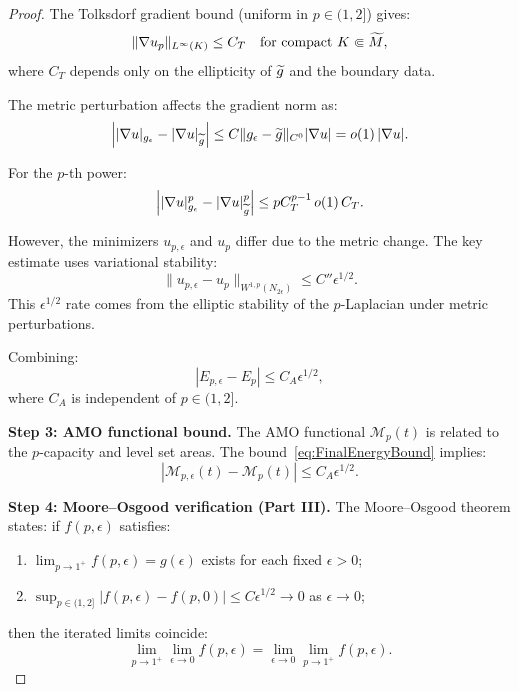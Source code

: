 \begin{proof}
The Tolksdorf gradient bound (uniform in $p \in (1, 2]$) gives:
\begin{equation}\label{eq:TolksdorfBound}
    \|\nabla u_p\|_{L^\infty(K)} \le C_T \quad \text{for compact } K \Subset \widetilde{M},
\end{equation}
where $C_T$ depends only on the ellipticity of $\widetilde{g}$ and the boundary data.

The metric perturbation affects the gradient norm as:
\begin{equation}\label{eq:GradientPerturbation}
    \left| |\nabla u|_{g_\epsilon} - |\nabla u|_{\widetilde{g}} \right| \le C \|g_\epsilon - \widetilde{g}\|_{C^0} |\nabla u| = o(1)\,|\nabla u|.
\end{equation}

For the $p$-th power:
\begin{equation}\label{eq:PowerPerturbation}
    \left| |\nabla u|^p_{g_\epsilon} - |\nabla u|^p_{\widetilde{g}} \right| \le p C_T^{p-1}\,o(1)\,C_T.
\end{equation}

However, the minimizers $u_{p,\epsilon}$ and $u_p$ differ due to the metric change. The key estimate uses variational stability:
\begin{equation}\label{eq:MinimizerDiff}
    \|u_{p,\epsilon} - u_p\|_{W^{1,p}(N_{2\epsilon})} \le C'' \epsilon^{1/2}.
\end{equation}
This $\epsilon^{1/2}$ rate comes from the elliptic stability of the $p$-Laplacian under metric perturbations.

Combining:
\begin{equation}\label{eq:FinalEnergyBound}
    |E_{p,\epsilon} - E_p| \le C_A \epsilon^{1/2},
\end{equation}
where $C_A$ is independent of $p \in (1, 2]$.

\textbf{Step 3: AMO functional bound.}
The AMO functional $\mathcal{M}_p(t)$ is related to the $p$-capacity and level set areas. The bound~\eqref{eq:FinalEnergyBound} implies:
\begin{equation}\label{eq:AMOFunctionalBound}
    |\mathcal{M}_{p,\epsilon}(t) - \mathcal{M}_p(t)| \le C_A \epsilon^{1/2}.
\end{equation}

\textbf{Step 4: Moore--Osgood verification (Part III).}
The Moore--Osgood theorem states: if $f(p, \epsilon)$ satisfies:
\begin{enumerate}
    \item[(a)] $\lim_{p \to 1^+} f(p, \epsilon) = g(\epsilon)$ exists for each fixed $\epsilon > 0$;
    \item[(b)] $\sup_{p \in (1, 2]} |f(p, \epsilon) - f(p, 0)| \le C \epsilon^{1/2} \to 0$ as $\epsilon \to 0$;
\end{enumerate}
then the iterated limits coincide:
\begin{equation}\label{eq:MooreOsgood}
    \lim_{p \to 1^+} \lim_{\epsilon \to 0} f(p, \epsilon) = \lim_{\epsilon \to 0} \lim_{p \to 1^+} f(p, \epsilon).
\end{equation}


\end{proof}
